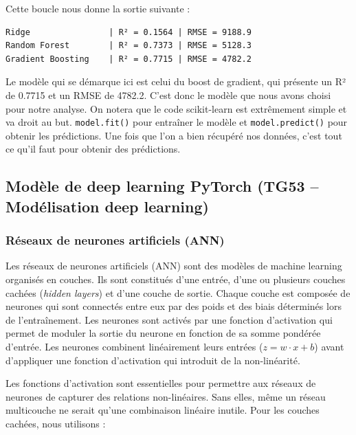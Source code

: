 \documentclass[11pt,a4paper]{article}
\begin{document}
Cette boucle nous donne la sortie suivante :
\begin{listing}[H]
\caption{Comparaison des modèles scikit-learn (sortie de script)}
\label{lst:sklearn-comparison-output}
\begin{lstlisting}[style=textstyle]
Ridge                | R² = 0.1564 | RMSE = 9188.9
Random Forest        | R² = 0.7373 | RMSE = 5128.3
Gradient Boosting    | R² = 0.7715 | RMSE = 4782.2
\end{lstlisting}
\end{listing}

Le modèle qui se démarque ici est celui du boost de gradient, qui présente un R² de 0.7715 et un RMSE de 4782.2. C'est donc le modèle que nous avons choisi pour notre analyse. On notera que le code scikit-learn est extrêmement simple et va droit au but. \lstinline{model.fit()} pour entraîner le modèle et \lstinline{model.predict()} pour obtenir les prédictions. Une fois que l'on a bien récupéré nos données, c'est tout ce qu'il faut pour obtenir des prédictions.

\clearpage
\subsection{Modèle de deep learning PyTorch (TG53 -- Modélisation deep learning)}

\subsubsection{Réseaux de neurones artificiels (ANN)}

Les réseaux de neurones artificiels (ANN) sont des modèles de machine learning organisés en couches. Ils sont constitués d'une entrée, d'une ou plusieurs couches cachées (\textit{hidden layers}) et d'une couche de sortie. Chaque couche est composée de neurones qui sont connectés entre eux par des poids et des biais déterminés lors de l'entraînement. Les neurones sont activés par une fonction d'activation qui permet de moduler la sortie du neurone en fonction de sa somme pondérée d'entrée.  Les neurones combinent linéairement leurs entrées (\(z = w \cdot x + b\)) avant d'appliquer une fonction d'activation qui introduit de la non-linéarité.

Les fonctions d'activation sont essentielles pour permettre aux réseaux de neurones de capturer des relations non-linéaires. Sans elles, même un réseau multicouche ne serait qu'une combinaison linéaire inutile. Pour les couches cachées, nous utilisons :
\end{document}
